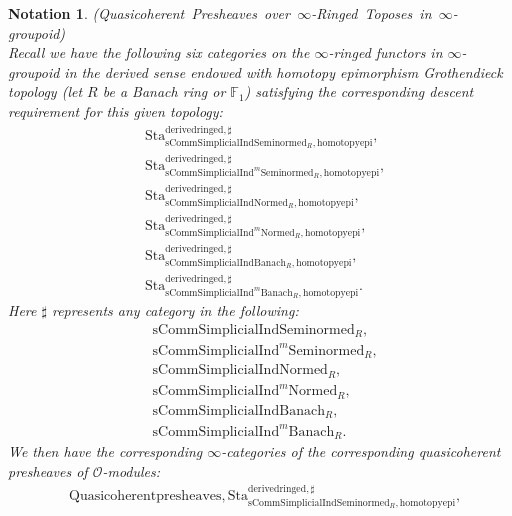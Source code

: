 \documentclass[12pt]{book}
\newtheorem{notation}{Notation}
\begin{document}
\begin{notation}\mbox{\rm{(Quasicoherent Presheaves over $\infty$-Ringed Toposes in $\infty$-groupoid)}}\\
Recall we have the following six categories on the $\infty$-ringed functors in $\infty$-groupoid in the derived sense endowed with homotopy epimorphism Grothendieck topology (let $R$ be a Banach ring or $\mathbb{F}_1$) satisfying the corresponding descent requirement for this given topology:
\begin{align}
&\mathrm{Sta}^\mathrm{derivedringed,\sharp}_{\mathrm{sComm}\mathrm{Simplicial}\mathrm{Ind}\mathrm{Seminormed}_R,\mathrm{homotopyepi}},\\
&\mathrm{Sta}^\mathrm{derivedringed,\sharp}_{\mathrm{sComm}\mathrm{Simplicial}\mathrm{Ind}^m\mathrm{Seminormed}_R,\mathrm{homotopyepi}},\\
&\mathrm{Sta}^\mathrm{derivedringed,\sharp}_{\mathrm{sComm}\mathrm{Simplicial}\mathrm{Ind}\mathrm{Normed}_R,\mathrm{homotopyepi}},\\
&\mathrm{Sta}^\mathrm{derivedringed,\sharp}_{\mathrm{sComm}\mathrm{Simplicial}\mathrm{Ind}^m\mathrm{Normed}_R,\mathrm{homotopyepi}},\\
&\mathrm{Sta}^\mathrm{derivedringed,\sharp}_{\mathrm{sComm}\mathrm{Simplicial}\mathrm{Ind}\mathrm{Banach}_R,\mathrm{homotopyepi}},\\
&\mathrm{Sta}^\mathrm{derivedringed,\sharp}_{\mathrm{sComm}\mathrm{Simplicial}\mathrm{Ind}^m\mathrm{Banach}_R,\mathrm{homotopyepi}}.	
\end{align}
Here $\sharp$ represents any category in the following:
\begin{align}
&\mathrm{sComm}\mathrm{Simplicial}\mathrm{Ind}\mathrm{Seminormed}_R,\\
&\mathrm{sComm}\mathrm{Simplicial}\mathrm{Ind}^m\mathrm{Seminormed}_R,\\
&\mathrm{sComm}\mathrm{Simplicial}\mathrm{Ind}\mathrm{Normed}_R,\\
&\mathrm{sComm}\mathrm{Simplicial}\mathrm{Ind}^m\mathrm{Normed}_R,\\
&\mathrm{sComm}\mathrm{Simplicial}\mathrm{Ind}\mathrm{Banach}_R,\\
&\mathrm{sComm}\mathrm{Simplicial}\mathrm{Ind}^m\mathrm{Banach}_R.	
\end{align}	
We then have the corresponding $\infty$-categories of the corresponding quasicoherent presheaves of $\mathcal{O}$-modules:
\begin{align}
&\mathrm{Quasicoherentpresheaves,Sta}^\mathrm{derivedringed,\sharp}_{\mathrm{sComm}\mathrm{Simplicial}\mathrm{Ind}\mathrm{Seminormed}_R,\mathrm{homotopyepi}},\\

\end{align}
\end{notation}
\end{document}
